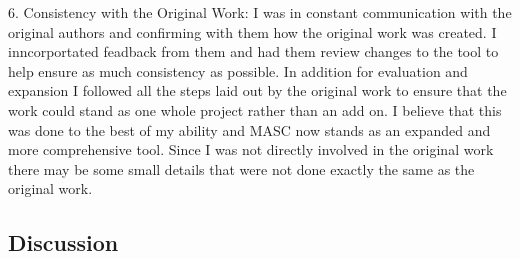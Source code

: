 6. Consistency with the Original Work: I was in constant communication with the original authors and confirming with them how the original work was created. I inncorportated feadback from them and had them review changes to the tool to help ensure as much consistency as possible. In addition for evaluation and expansion I followed all the steps laid out by the original work to ensure that the work could stand as one whole project rather than an add on. I believe that this was done to the best of my ability and MASC now stands as an expanded and more comprehensive tool. Since I was not directly involved in the original work there may be some small details that were not done exactly the same as the original work.

\subsection{Discussion}
\label{ch6:sec:discussion}

